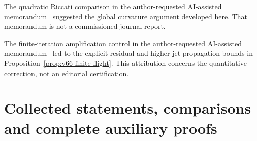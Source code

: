 The quadratic Riccati comparison in the author-requested AI-assisted
memorandum~\cite{A2ReviewV65} suggested the global curvature argument
developed here.  That memorandum is not a commissioned journal report.

The finite-iteration amplification control in the author-requested
AI-assisted memorandum~\cite{A2ReviewV66} led to the explicit residual
and higher-jet propagation bounds in
Proposition~\ref{prop:v66-finite-flight}.  This attribution concerns
the quantitative correction, not an editorial certification.

\appendix
\renewcommand{\thesection}{A.\arabic{section}}
\renewcommand{\theHsection}{appendix.\arabic{section}}
\part{Collected statements, comparisons and complete auxiliary proofs}










